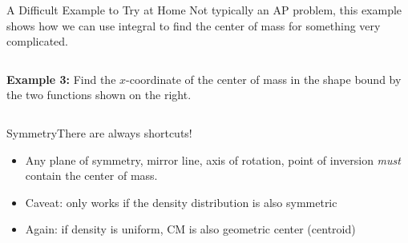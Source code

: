 \documentclass[12pt,compress,aspectratio=169]{beamer}
\begin{document}
\begin{frame}{A Difficult Example to Try at Home}
  Not typically an AP problem, this example shows how we can use integral to
  find the center of mass for something very complicated.
  \begin{columns}
    \textbf{Example 3:} Find the $x$-coordinate of the center of mass in the
    shape bound by the two functions shown on the right.

  \end{columns}
\end{frame}



\begin{frame}{Symmetry}{There are always shortcuts!}
  \begin{itemize}
  \item Any plane of symmetry, mirror line, axis of rotation, point of inversion
    \emph{must} contain the center of mass.
  \item Caveat: only works if the density distribution is also symmetric
  \item Again: if density is uniform, CM is also geometric center (centroid)
  \end{itemize}
\end{frame}
\end{document}

